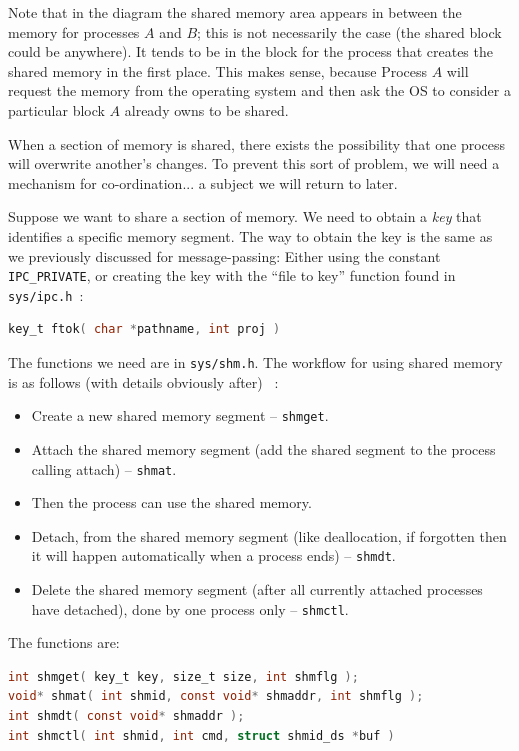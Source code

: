 Note that in the diagram the shared memory area appears in between the memory for processes $A$ and $B$; this is not necessarily the case (the shared block could be anywhere). It tends to be in the block for the process that creates the shared memory in the first place. This makes sense, because Process $A$ will request the memory from the operating system and then ask the OS to consider a particular block $A$ already owns to be shared.

When a section of memory is shared, there exists the possibility that one process will overwrite another's changes. To prevent this sort of problem, we will need a mechanism for co-ordination... a subject we will return to later.

Suppose we want to share a section of memory. We need to obtain a \textit{key} that identifies a specific memory segment. The way to obtain the key is the same as we previously discussed for message-passing: Either using the constant \texttt{IPC\_PRIVATE}, or creating the key with the ``file to key'' function found in \texttt{sys/ipc.h}~\cite{lpi}:
\begin{lstlisting}[language=C]
key_t ftok( char *pathname, int proj )
\end{lstlisting}

The functions we need are in \texttt{sys/shm.h}. The workflow for using shared memory is as follows (with details obviously after) ~\cite{lpi}:
\begin{itemize}
	\item Create a new shared memory segment -- \texttt{shmget}.
	\item Attach the shared memory segment (add the shared segment to the process calling attach) -- \texttt{shmat}.
	\item Then the process can use the shared memory.
	\item Detach, from the shared memory segment (like deallocation, if forgotten then it will happen automatically when a process ends) -- \texttt{shmdt}.
	\item Delete the shared memory segment (after all currently attached processes have detached), done by one process only -- \texttt{shmctl}.
\end{itemize}

The functions are:

\begin{lstlisting}[language=C]
int shmget( key_t key, size_t size, int shmflg );
void* shmat( int shmid, const void* shmaddr, int shmflg );
int shmdt( const void* shmaddr );
int shmctl( int shmid, int cmd, struct shmid_ds *buf )
\end{lstlisting}


